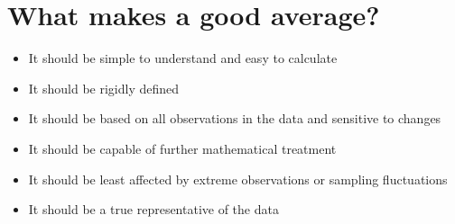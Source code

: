 \documentclass[
10pt, %
a4paper, %
]{report}
\begin{document}
\section{What makes a good average?}

\begin{itemize}
\item It should be simple to understand and easy to calculate
\item It should be rigidly defined
\item It should be based on all observations in the data and sensitive to changes
\item It should be capable of further mathematical treatment
\item It should be least affected by extreme observations or sampling fluctuations
\item It should be a true representative of the data
\end{itemize}
\end{document}
